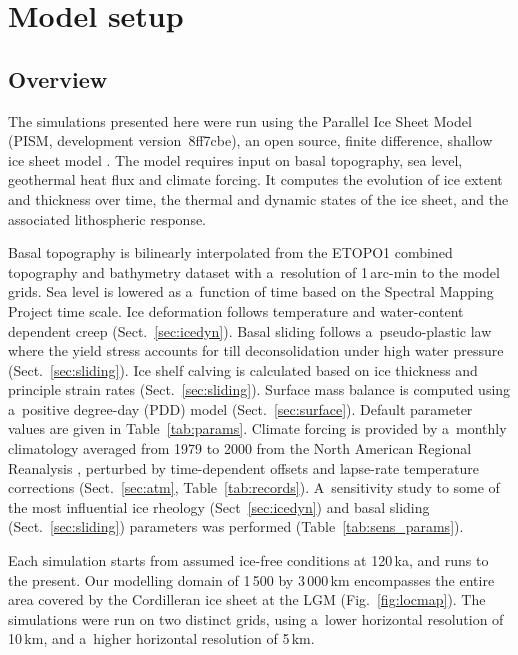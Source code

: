 \documentclass[tc, manuscript]{copernicus}
\begin{document}
\section{Model setup}
\label{sec:model}

\subsection{Overview}
\label{sec:overview}%

      The simulations presented here were run using the Parallel Ice Sheet
      Model (PISM, development version~8ff7cbe), an open source, finite
      difference, shallow ice sheet model \citep{PISM-authors.2015}. The
      model requires input on basal topography, sea level, geothermal heat
      flux and climate forcing. It computes the evolution of ice extent and
      thickness over time, the thermal and dynamic states of the ice sheet,
      and the associated lithospheric response.

      Basal topography is bilinearly interpolated from the ETOPO1 combined
      topography and bathymetry dataset with a~resolution of 1\,arc-min
      \citep{Amante.Eakins.2009} to the model grids. Sea level is lowered as
      a~function of time based on the Spectral Mapping Project
      \citep[SPECMAP,][]{Imbrie.etal.1989} time scale. Ice deformation
      follows temperature and water-content dependent creep
      (Sect.~\ref{sec:icedyn}). Basal sliding follows
      a~pseudo-plastic law where the yield stress accounts for till
      deconsolidation under high water pressure (Sect.~\ref{sec:sliding}).
      Ice shelf calving is calculated based on ice thickness and principle
      strain rates (Sect.~\ref{sec:sliding}). Surface mass balance is
      computed using a~positive degree-day (PDD) model
      (Sect.~\ref{sec:surface}). Default parameter values are given in
      Table~\ref{tab:params}. Climate forcing is provided by a~monthly
      climatology averaged from 1979 to 2000 from the North American
      Regional Reanalysis \citep[NARR,][]{Mesinger.etal.2006}, perturbed
      by time-dependent offsets and lapse-rate temperature corrections
      (Sect.~\ref{sec:atm}, Table~\ref{tab:records}). A~sensitivity study
      to some of the most influential ice rheology (Sect~\ref{sec:icedyn})
      and basal sliding (Sect.~\ref{sec:sliding}) parameters was performed
      (Table~\ref{tab:sens_params}).

      Each simulation starts from assumed ice-free conditions at
      120\,\unit{ka}, and runs to the present.
      Our modelling domain of 1\,500 by 3\,000\,\unit{km} encompasses
      the entire area covered by the Cordilleran ice sheet at the LGM
      (Fig.~\ref{fig:locmap}). The simulations were run on two distinct
      grids, using a~lower horizontal resolution of 10\,\unit{km}, and
      a~higher horizontal resolution of 5\,\unit{km}.
\end{document}
